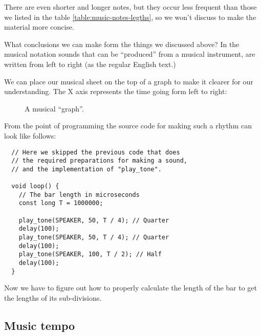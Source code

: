 \documentclass[../sparc.tex]{subfiles}
\begin{document}
There are even shorter and longer notes, but they occur less frequent than those
we listed in the table \ref{table:music-notes-legths}, so we won't discuss to
make the material more concise.

What conclusions we can make form the things we discussed above?  In the musical
notation sounds that can be ``produced'' from a musical instrument, are written
from left to right (as the regular English text.)

We can place our musical sheet on the top of a graph to make it clearer for our
understanding.  The $\mbox{X}$ axis represents the time going form left to
right:

\begin{figure}[ht]
  \centering

  \caption{A musical ``graph''.}
  \label{fig:lilypond-queen-1}
\end{figure}

From the point of programming the source code for making such a rhythm can look
like follows:

\begin{verbatim}
  // Here we skipped the previous code that does
  // the required preparations for making a sound,
  // and the implementation of "play_tone".

  void loop() {
    // The bar length in microseconds
    const long T = 1000000;

    play_tone(SPEAKER, 50, T / 4); // Quarter
    delay(100);
    play_tone(SPEAKER, 50, T / 4); // Quarter
    delay(100);
    play_tone(SPEAKER, 100, T / 2); // Half
    delay(100);
  }
\end{verbatim}

Now we have to figure out how to properly calculate the length of the bar to get
the lengths of its sub-divisions.

\subsection{Music tempo}
\end{document}
